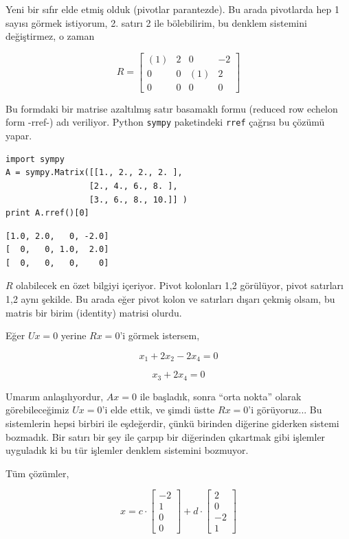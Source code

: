 \documentclass[12pt,fleqn]{article}\usepackage{../../common}
\begin{document}
Yeni bir sıfır elde etmiş olduk (pivotlar parantezde). Bu arada
pivotlarda hep 1 sayısı görmek istiyorum, 2. satırı 2 ile bölebilirim, bu
denklem sistemini değiştirmez, o zaman

$$ R = 
\left[\begin{array}{cccc}
(1) & 2 & 0 & -2  \\
0 & 0 & (1) & 2 \\
0 & 0 & 0 & 0
\end{array}\right]
 $$

Bu formdaki bir matrise azaltılmış satır basamaklı formu (reduced row
echelon form -rref-) adı veriliyor. Python \verb!sympy! paketindeki
\verb!rref! çağrısı bu çözümü yapar.

\begin{verbatim}
import sympy
A = sympy.Matrix([[1., 2., 2., 2. ],
                 [2., 4., 6., 8. ],
                 [3., 6., 8., 10.]] )
print A.rref()[0]
\end{verbatim}

\begin{verbatim}
[1.0, 2.0,   0, -2.0]
[  0,   0, 1.0,  2.0]
[  0,   0,   0,    0]
\end{verbatim}

$R$ olabilecek en özet bilgiyi içeriyor. Pivot kolonları 1,2 görülüyor,
pivot satırları 1,2 aynı şekilde. Bu arada eğer pivot kolon ve satırları
dışarı çekmiş olsam, bu matris bir birim (identity) matrisi olurdu. 

Eğer $Ux=0$ yerine $Rx=0$'i görmek istersem, 


$$ x_1 + 2x_2 - 2x_4 = 0 $$

$$ x_3 + 2x_4 = 0 $$

Umarım anlaşılıyordur, $Ax=0$ ile başladık, sonra ``orta nokta'' olarak
görebileceğimiz $Ux=0$'i elde ettik, ve şimdi üstte $Rx=0$'i
görüyoruz... Bu sistemlerin hepsi birbiri ile eşdeğerdir, çünkü birinden
diğerine giderken sistemi bozmadık. Bir satırı bir şey ile çarpıp bir
diğerinden çıkartmak gibi işlemler uyguladık ki bu tür işlemler denklem
sistemini bozmuyor.

Tüm çözümler, 

$$ 
x = 
c \cdot 
\left[\begin{array}{r}
-2\\ 1\\ 0\\ 0
\end{array}\right]
+
d \cdot 
\left[\begin{array}{r}
2\\ 0\\ -2\\ 1
\end{array}\right]
 $$
\end{document}
